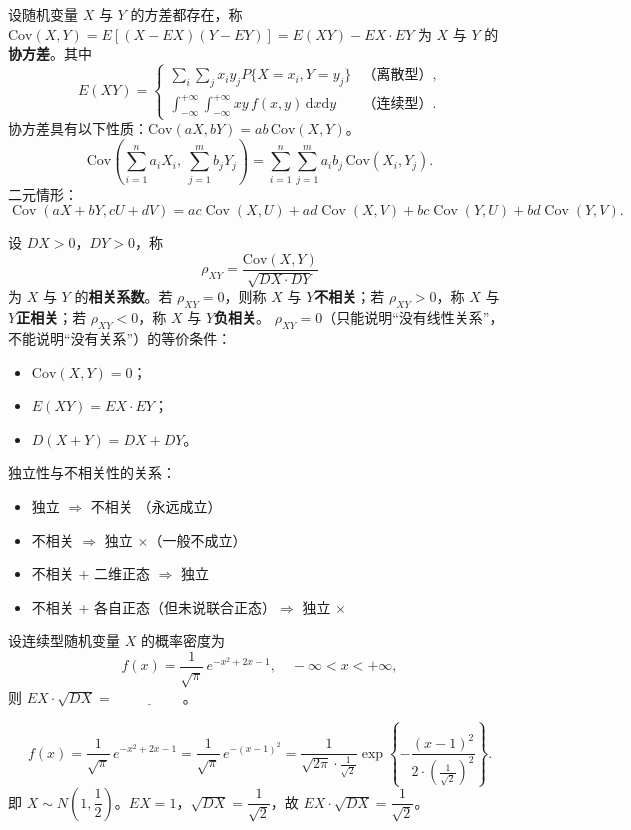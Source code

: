 \documentclass[lang=cn,11pt]{elegantbook}
\begin{document}
\begin{definition}[协方差] \label{def:covariance}
设随机变量 \(X\) 与 \(Y\) 的方差都存在，称
\(
\mathrm{Cov}(X,Y) = E[(X - EX)(Y - EY)] = E(XY) - EX \cdot EY
\)
为 \(X\) 与 \(Y\) 的\textbf{协方差}。其中
\[
E(XY) = \begin{cases}
\sum\limits_{i}\sum\limits_{j} x_i y_j P\{X=x_i,Y=y_j\} & \text{（离散型）}, \\[8pt]
\int_{-\infty}^{+\infty}\int_{-\infty}^{+\infty} xy\,f(x,y)\,\mathrm{d}x\mathrm{d}y & \text{（连续型）}.
\end{cases}
\]
协方差具有以下性质：\(\mathrm{Cov}(aX, bY) = ab\,\mathrm{Cov}(X,Y)\)。
    \[
    \mathrm{Cov}\!\left(\sum_{i=1}^{n} a_i X_i,\ \sum_{j=1}^{m} b_j Y_j\right) = \sum_{i=1}^{n}\sum_{j=1}^{m} a_i b_j\,\mathrm{Cov}(X_i, Y_j).
    \]
    二元情形：\[\operatorname{Cov}(aX+bY,cU+dV)=ac\operatorname{Cov}(X,U)+ad\operatorname{Cov}(X,V)+bc\operatorname{Cov}(Y,U)+bd\operatorname{Cov}(Y,V).\]
\end{definition}


\begin{definition}[相关系数] \label{def:correlation}
设 \(DX > 0\)，\(DY > 0\)，称
\[
\rho_{XY} = \frac{\mathrm{Cov}(X,Y)}{\sqrt{DX \cdot DY}}
\]
为 \(X\) 与 \(Y\) 的\textbf{相关系数}。若 \(\rho_{XY} = 0\)，则称 \(X\) 与 \(Y\)\textbf{不相关}；若 \(\rho_{XY} > 0\)，称 \(X\) 与 \(Y\)\textbf{正相关}；若 \(\rho_{XY} < 0\)，称 \(X\) 与 \(Y\)\textbf{负相关}。
\(\rho_{XY} = 0\)（只能说明“没有线性关系”，不能说明“没有关系”）的等价条件：
    \begin{itemize}
        \item \(\mathrm{Cov}(X,Y) = 0\)；
        \item \(E(XY) = EX \cdot EY\)；
        \item \(D(X + Y) = DX + DY\)。
    \end{itemize}
独立性与不相关性的关系：
\begin{itemize}
    \item 独立 $\Rightarrow$ 不相关 \checkmark（永远成立）
    \item 不相关 $\Rightarrow$ 独立 $\times$（一般不成立）
    \item 不相关 + 二维正态 $\Rightarrow$ 独立 \checkmark
    \item 不相关 + 各自正态（但未说联合正态）$\Rightarrow$ 独立 $\times$
\end{itemize}
\end{definition}

\begin{exercise}\label{exer:4-4-normal}
设连续型随机变量 \(X\) 的概率密度为
\[
f(x) = \frac{1}{\sqrt{\pi}}\,e^{-x^2 + 2x - 1}, \quad -\infty < x < +\infty,
\]
则 \(EX \cdot \sqrt{DX} =\,\underline{\hspace{2cm}}\)。
\end{exercise}
\begin{solution}
\[
f(x) = \frac{1}{\sqrt{\pi}}\,e^{-x^2+2x-1} = \frac{1}{\sqrt{\pi}}\,e^{-(x-1)^2} = \frac{1}{\sqrt{2\pi}\cdot\frac{1}{\sqrt{2}}}\exp\!\left\{-\frac{(x-1)^2}{2\cdot\left(\frac{1}{\sqrt{2}}\right)^2}\right\}.
\]
即 $X \sim N\!\left(1,\dfrac{1}{2}\right)$。$EX = 1$，$\sqrt{DX} = \dfrac{1}{\sqrt{2}}$，故 $EX \cdot \sqrt{DX} = \dfrac{1}{\sqrt{2}}$。
\end{solution}
\end{document}
